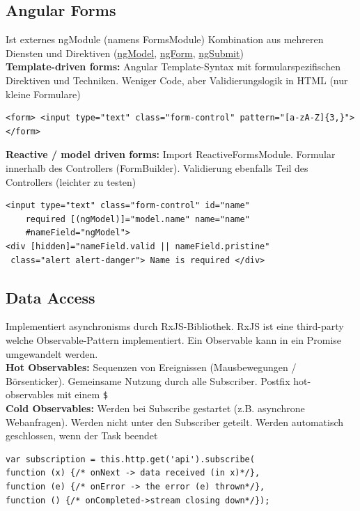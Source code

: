 \subsection{Angular Forms}
Ist externes ngModule (namens FormsModule)
Kombination aus mehreren Diensten und Direktiven (\underline{ngModel}, \underline{ngForm}, \underline{ngSubmit})\\
\textbf{Template-driven forms:}
Angular Template-Syntax mit formularspezifischen Direktiven und Techniken. Weniger Code, aber Validierungslogik in HTML (nur kleine Formulare)
\begin{lstlisting}[style=HTML]
<form> <input type="text" class="form-control" pattern="[a-zA-Z]{3,}"></form>
\end{lstlisting}
\textbf{Reactive / model driven forms:}
Import ReactiveFormsModule. Formular innerhalb des Controllers (FormBuilder). Validierung ebenfalls Teil des Controllers (leichter zu testen)
\begin{lstlisting}[style=HTML]
<input type="text" class="form-control" id="name"
    required [(ngModel)]="model.name" name="name"
    #nameField="ngModel">
<div [hidden]="nameField.valid || nameField.pristine"
 class="alert alert-danger"> Name is required </div>
\end{lstlisting}

\subsection{Data Access}
Implementiert asynchronisms durch RxJS-Bibliothek. RxJS ist eine third-party welche Observable-Pattern implementiert. Ein Observable kann in ein Promise umgewandelt werden.\\
\textbf{Hot Observables:} Sequenzen von Ereignissen (Mausbewegungen / Börsenticker). Gemeinsame Nutzung durch alle Subscriber. Postfix hot-observables mit einem \texttt{\tiny \$}\\
\textbf{Cold Observables:} Werden bei Subscribe gestartet (z.B. asynchrone Webanfragen). Werden nicht unter den Subscriber geteilt. Werden automatisch geschlossen, wenn der Task beendet
\begin{lstlisting}
var subscription = this.http.get('api').subscribe(
function (x) {/* onNext -> data received (in x)*/},
function (e) {/* onError -> the error (e) thrown*/},
function () {/* onCompleted->stream closing down*/});
\end{lstlisting}

